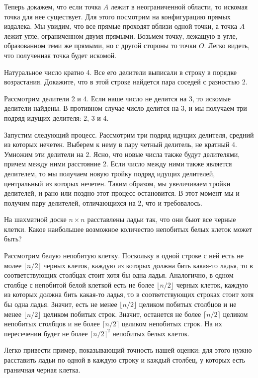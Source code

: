 \begin{problems}
Теперь докажем, что если точка $A$ лежит в неограниченной области, то искомая точка для нее существует. Для этого посмотрим на конфигурацию прямых издалека. Мы увидим, что все прямые проходят вблизи одной точки, а точка $A$ лежит угле, ограниченном двумя прямыми. Возьмем точку, лежащую в угле, образованном теми же прямыми, но с другой стороны то точки $O$. Легко видеть, что полученная точка будет искомой. 

\item Натуральное число кратно 4. Все его делители выписали в строку в порядке возрастания. Докажите, что в
этой строке найдется пара соседей с разностью 2.

 Рассмотрим делители 2 и 4. Если наше число не делится на 3, то искомые делители найдены. В противном случае число делится на 3, и мы получаем три подряд идущих делителя: 2, 3 и 4. 

Запустим следующий процесс. Рассмотрим три подряд идущих делителя, средний из которых нечетен. Выберем к нему в пару четный делитель, не кратный 4. Умножим эти делители на 2. Ясно, что новые числа также будут делителями, причем между ними расстояние 2. Если число между ними также является делителем, то мы получаем новую тройку подряд идущих делителей, центральный из которых нечетен. Таким образом, мы увеличиваем тройки делителей, и рано или поздно этот процесс остановится. В этот момент мы и получим пару делителей, отличающихся на 2, что и требовалось.

\item На шахматной доске $n\times n$ расставлены ладьи так, что они бьют все черные клетки. Какое наибольшее возможное количество непобитых белых клеток может быть?

 Рассмотрим белую непобитую клетку. Поскольку в одной строке с ней есть не молее $\lfloor n/2\rfloor$ черных клеток, каждую из которых должна бить какая-то ладья, то в соответствующих столбцах стоит хотя бы одна ладья. Аналогично, в одном столбце с непобитой белой клеткой есть не более $\lfloor n/2\rfloor$ черных клеток, каждую из которых должна бить какая-то ладья, то в соответствующих строках стоит хотя бы одна ладья. Значит, есть не менее $\lfloor n/2\rfloor$ целиком побитых столбцов и не менее $\lfloor n/2\rfloor$ целиком побитых строк. Значит, останется не более $\lceil n/2\rceil$ целиком непобитых столбцов и не более $\lceil n/2\rceil$ целиком непобитых строк. На их пересечении будет не более $\lceil n/2\rceil^2$ непобитых белых клеток.

Легко привести пример, показывающий точность нашей оценки: для этого нужно расставить ладьи по одной в каждую строку и каждый столбец, у которых есть граничная черная клетка.


\end{problems}
